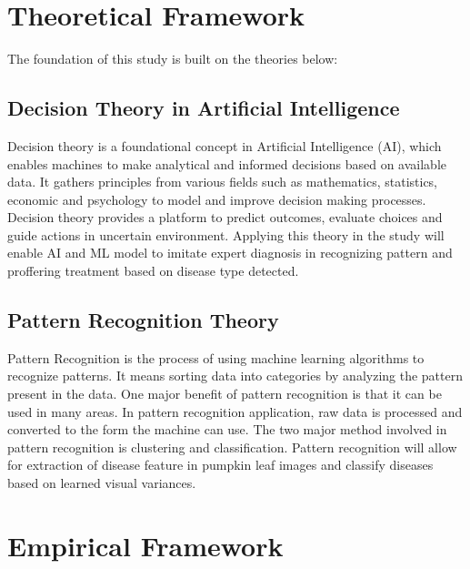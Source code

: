 \newpage
\section{Theoretical Framework} \nameTitleSpace
The foundation of this study is built on the theories below:
\subsection{Decision Theory in Artificial Intelligence}\sectionTitleBody
Decision theory is a foundational concept in Artificial Intelligence
	(AI), which enables machines to make analytical and informed decisions
	based on available data. It gathers principles from various fields
	such as mathematics, statistics, economic and psychology to model
	and improve decision making processes. Decision theory provides a
	platform to predict outcomes, evaluate choices and guide actions in
	uncertain environment. Applying this theory in the study will enable
	AI and ML model to imitate expert diagnosis in recognizing pattern
	and proffering treatment based on disease type detected.

\subsection{Pattern Recognition Theory} \sectionTitleBody
Pattern Recognition is the process of using machine learning
	algorithms to recognize patterns. It means sorting data into categories
	by analyzing the pattern present in the data. One major benefit of
	pattern recognition is that it can be used in many areas. In pattern recognition
	application, raw data is processed and converted to the form the machine
	can use. The two major method involved in pattern recognition is clustering
	and classification. Pattern recognition will allow for extraction
	of disease feature in pumpkin leaf images and classify diseases based
	on learned visual variances.

\section{Empirical Framework} \nameTitleSpace
